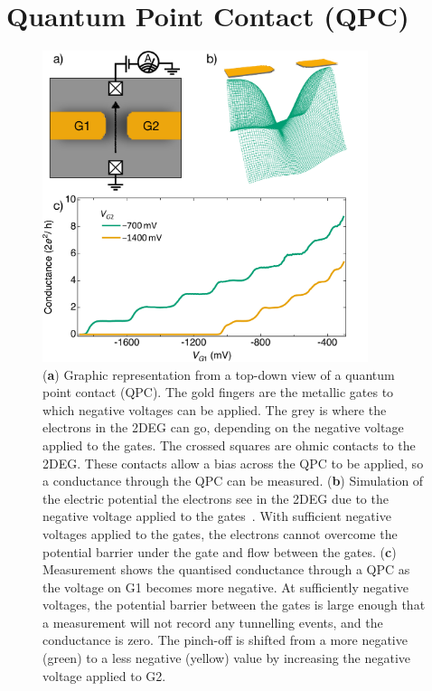 \afterpage{\clearpage}
\section{Quantum Point Contact (QPC)}

\begin{figure}[!htb]
 \begin{center}
 \includegraphics[width=0.85\textwidth]{figures/ch1/figure3.pdf}
 \caption[Quantum Point Contact]{\label{fig:ch1/qpc_intro} 
 (\textbf{a}) Graphic representation from a top-down view of a quantum point contact (QPC). The gold fingers are the metallic gates to which negative voltages can be applied. The grey is where the electrons in the 2DEG can go, depending on the negative voltage applied to the gates. The crossed squares are ohmic contacts to the 2DEG. These contacts allow a bias across the QPC to be applied, so a conductance through the QPC can be measured. (\textbf{b}) Simulation of the electric potential the electrons see in the 2DEG due to the negative voltage applied to the gates~\cite{Davies1995}. With sufficient negative voltages applied to the gates, the electrons cannot overcome the potential barrier under the gate and flow between the gates. (\textbf{c}) Measurement shows the quantised conductance through a QPC as the voltage on G1 becomes more negative. At sufficiently negative voltages, the potential barrier between the gates is large enough that a measurement will not record any tunnelling events, and the conductance is zero. The pinch-off is shifted from a more negative (green) to a less negative (yellow) value by increasing the negative voltage applied to G2.
 }
 \end{center}
\end{figure}

